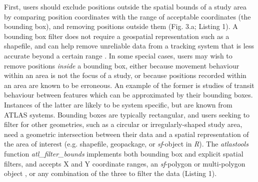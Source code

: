 \begin{refsection}
    First, users should exclude positions outside the spatial bounds of a study area by comparing position coordinates with the range of acceptable coordinates (the bounding box), and removing positions outside them (Fig. 3.a; Listing 1). 
    A bounding box filter does not require a geospatial representation such as a shapefile, and can help remove unreliable data from a tracking system that is less accurate beyond a certain range \citep[][]{beardsworth2021}.
    In some special cases, users may wish to remove positions \textit{inside} a bounding box, either because movement behaviour within an area is not the focus of a study, or because positions recorded within an area are known to be erroneous.
    An example of the former is studies of transit behaviour between features which can be approximated by their bounding boxes. 
    Instances of the latter are likely to be system specific, but are known from ATLAS systems. 
    Bounding boxes are typically rectangular, and users seeking to filter for other geometries, such as a circular or irregularly-shaped study area, need a geometric intersection between their data and a spatial representation of the area of interest (e.g. shapefile, geopackage, or \textit{sf}-object in \textit{R}).
    The \textit{atlastools} function \textit{atl\_filter\_bounds} implements both bounding box and explicit spatial filters, and accepts X and Y coordinate ranges, an \textit{sf}-polygon or multi-polygon object \citep{pebesma2018}, or any combination of the three to filter the data (Listing 1).



\end{refsection}

